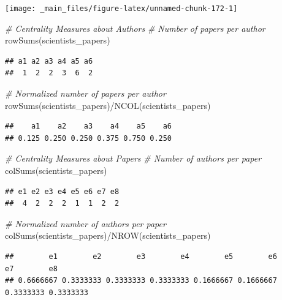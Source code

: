 \documentclass[
  notitlepage,
  onecolumn,
  openany]{book}
\newenvironment{Shaded}{\begin{snugshade}}{\end{snugshade}}
\newcommand{\CommentTok}[1]{\textcolor[rgb]{0.56,0.35,0.01}{\textit{#1}}}
\newcommand{\FunctionTok}[1]{\textcolor[rgb]{0.00,0.00,0.00}{#1}}
\newcommand{\NormalTok}[1]{#1}
\newcommand{\SpecialCharTok}[1]{\textcolor[rgb]{0.00,0.00,0.00}{#1}}
\begin{document}
\texttt{[image: \_main\_files/figure-latex/unnamed-chunk-172-1]}

\begin{Shaded}
\begin{Highlighting}[]
\CommentTok{\# Centrality Measures about Authors}
\CommentTok{\# Number of papers per author}
\FunctionTok{rowSums}\NormalTok{(scientists\_papers)}
\end{Highlighting}
\end{Shaded}

\begin{verbatim}
## a1 a2 a3 a4 a5 a6 
##  1  2  2  3  6  2
\end{verbatim}

\begin{Shaded}
\begin{Highlighting}[]
\CommentTok{\# Normalized number of papers per author}
\FunctionTok{rowSums}\NormalTok{(scientists\_papers)}\SpecialCharTok{/}\FunctionTok{NCOL}\NormalTok{(scientists\_papers)}
\end{Highlighting}
\end{Shaded}

\begin{verbatim}
##    a1    a2    a3    a4    a5    a6 
## 0.125 0.250 0.250 0.375 0.750 0.250
\end{verbatim}

\begin{Shaded}
\begin{Highlighting}[]
\CommentTok{\# Centrality Measures about Papers}
\CommentTok{\# Number of authors per paper}
\FunctionTok{colSums}\NormalTok{(scientists\_papers)}
\end{Highlighting}
\end{Shaded}

\begin{verbatim}
## e1 e2 e3 e4 e5 e6 e7 e8 
##  4  2  2  2  1  1  2  2
\end{verbatim}

\begin{Shaded}
\begin{Highlighting}[]
\CommentTok{\# Normalized number of authors per paper}
\FunctionTok{colSums}\NormalTok{(scientists\_papers)}\SpecialCharTok{/}\FunctionTok{NROW}\NormalTok{(scientists\_papers)}
\end{Highlighting}
\end{Shaded}

\begin{verbatim}
##        e1        e2        e3        e4        e5        e6        e7        e8 
## 0.6666667 0.3333333 0.3333333 0.3333333 0.1666667 0.1666667 0.3333333 0.3333333
\end{verbatim}
\end{document}
